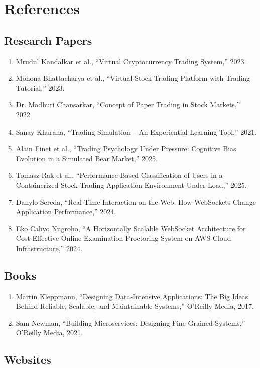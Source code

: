\chapter{References}

\section[Research Papers]{\textbf{Research Papers}}

\begin{enumerate}
\item Mrudul Kandalkar et al., ``Virtual Cryptocurrency Trading System,'' 2023.
\item Mohona Bhattacharya et al., ``Virtual Stock Trading Platform with Trading Tutorial,'' 2023.
\item Dr. Madhuri Chansarkar, ``Concept of Paper Trading in Stock Markets,'' 2022.
\item Sanay Khurana, ``Trading Simulation -- An Experiential Learning Tool,'' 2021.
\item Alain Finet et al., ``Trading Psychology Under Pressure: Cognitive Bias Evolution in a Simulated Bear Market,'' 2025.
\item Tomasz Rak et al., ``Performance-Based Classification of Users in a Containerized Stock Trading Application Environment Under Load,'' 2025.
\item Danylo Sereda, ``Real-Time Interaction on the Web: How WebSockets Change Application Performance,'' 2024.
\item Eko Cahyo Nugroho, ``A Horizontally Scalable WebSocket Architecture for Cost-Effective Online Examination Proctoring System on AWS Cloud Infrastructure,'' 2024.
\end{enumerate}

\section[Books]{\textbf{Books}}

\begin{enumerate}
\item Martin Kleppmann, ``Designing Data-Intensive Applications: The Big Ideas Behind Reliable, Scalable, and Maintainable Systems,'' O'Reilly Media, 2017.
\item Sam Newman, ``Building Microservices: Designing Fine-Grained Systems,'' O'Reilly Media, 2021.
\end{enumerate}

\section[Websites]{\textbf{Websites}}

